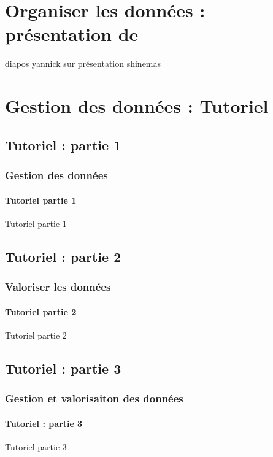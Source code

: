 \section{Organiser les données : présentation de \BDD}
\begin{frame}\small\tableofcontents[currentsection,currentsubsection,subsectionstyle=show/show/hide]\end{frame}

\begin{frame}
diapos yannick sur présentation shinemas
\end{frame}
\section{Gestion des données : Tutoriel}

\subsection{Tutoriel : partie 1}
\begin{frame}
\frametitle{Gestion des données}
\framesubtitle{Tutoriel partie 1}
\begin{block}{}
\centering \Huge Tutoriel partie 1
\end{block}
\end{frame}


\subsection{Tutoriel : partie 2}
\begin{frame}
\frametitle{Valoriser les données}
\framesubtitle{Tutoriel partie 2}
\begin{block}{}
\centering \Huge Tutoriel partie 2
\end{block}
\end{frame}

\subsection{Tutoriel : partie 3}
\begin{frame}
\frametitle{Gestion et valorisaiton des données}
\framesubtitle{Tutoriel : partie 3}
\begin{block}{}
\centering \Huge Tutoriel partie 3
\end{block}
\end{frame}

